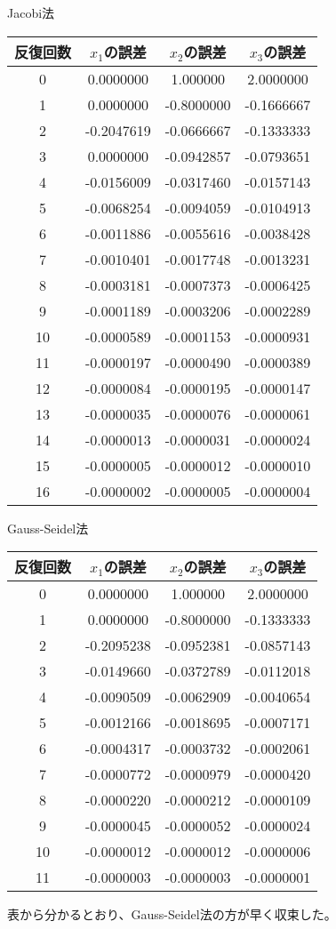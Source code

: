 \documentclass[]{jsarticle}
\begin{document}
Jacobi法
\begin{table}[H]
  \begin{tabular}{|c|c|c|c|}\hline
反復回数&$x_1$の誤差&$x_2$の誤差&$x_3$の誤差\\\hline
0&0.0000000&1.000000&2.0000000\\\hline
1&0.0000000&-0.8000000&-0.1666667\\\hline
2&-0.2047619&-0.0666667&-0.1333333\\\hline
3&0.0000000&-0.0942857&-0.0793651\\\hline
4&-0.0156009&-0.0317460&-0.0157143\\\hline
5&-0.0068254&-0.0094059&-0.0104913\\\hline
6&-0.0011886&-0.0055616&-0.0038428\\\hline
7&-0.0010401&-0.0017748&-0.0013231\\\hline
8&-0.0003181&-0.0007373&-0.0006425\\\hline
9&-0.0001189&-0.0003206&-0.0002289\\\hline
10&-0.0000589&-0.0001153&-0.0000931\\\hline
11&-0.0000197&-0.0000490&-0.0000389\\\hline
12&-0.0000084&-0.0000195&-0.0000147\\\hline
13&-0.0000035&-0.0000076&-0.0000061\\\hline
14&-0.0000013&-0.0000031&-0.0000024\\\hline
15&-0.0000005&-0.0000012&-0.0000010\\\hline
16&-0.0000002&-0.0000005&-0.0000004\\\hline
\end{tabular}
\end{table}

Gauss-Seidel法
\begin{table}[H]
  \begin{tabular}{|c|c|c|c|}\hline
反復回数&$x_1$の誤差&$x_2$の誤差&$x_3$の誤差\\\hline
0&0.0000000&1.000000&2.0000000\\\hline
1&0.0000000&-0.8000000&-0.1333333\\\hline
2&-0.2095238&-0.0952381&-0.0857143\\\hline
3&-0.0149660&-0.0372789&-0.0112018\\\hline
4&-0.0090509&-0.0062909&-0.0040654\\\hline
5&-0.0012166&-0.0018695&-0.0007171\\\hline
6&-0.0004317&-0.0003732&-0.0002061\\\hline
7&-0.0000772&-0.0000979&-0.0000420\\\hline
8&-0.0000220&-0.0000212&-0.0000109\\\hline
9&-0.0000045&-0.0000052&-0.0000024\\\hline
10&-0.0000012&-0.0000012&-0.0000006\\\hline
11&-0.0000003&-0.0000003&-0.0000001\\\hline
\end{tabular}
\end{table}

表から分かるとおり、Gauss-Seidel法の方が早く収束した。
\end{document}
